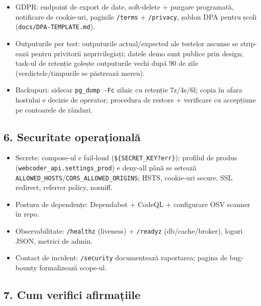\documentclass[
]{article}
\providecommand{\tightlist}{%
  \setlength{\itemsep}{0pt}\setlength{\parskip}{0pt}}
\begin{document}
\begin{itemize}
\tightlist
\item
  GDPR: endpoint de export de date, soft-delete + purgare programată,
  notificare de cookie-uri, paginile \texttt{/terms} +
  \texttt{/privacy}, șablon DPA pentru școli
  (\texttt{docs/DPA-TEMPLATE.md}).
\item
  Outputurile per test: outputurile actual/expected ale testelor ascunse
  se strip-ează pentru privitorii neprivilegiați; datele demo sunt
  publice prin design; task-ul de retenție golește outputurile vechi
  după 90 de zile (verdictele/timpurile se păstrează mereu).
\item
  Backupuri: sidecar \texttt{pg\_dump\ -Fc} zilnic cu retenție 7z/4s/6l;
  copia în afara hostului e decizie de operator; procedura de restore +
  verificare cu accepțiune pe contoarele de rânduri.
\end{itemize}

\subsection{6. Securitate
operațională}\label{6-securitate-operaux21bionalux103}

\begin{itemize}
\tightlist
\item
  Secrete: compose-ul e fail-loud (\texttt{\$\{SECRET\_KEY?err\}});
  profilul de produs (\texttt{webcoder\_api.settings\_prod}) e deny-all
  până se setează
  \texttt{ALLOWED\_HOSTS}/\texttt{CORS\_ALLOWED\_ORIGINS}; HSTS,
  cookie-uri secure, SSL redirect, referrer policy, nosniff.
\item
  Postura de dependențe: Dependabot + CodeQL + configurare OSV scanner
  în repo.
\item
  Observabilitate: \texttt{/healthz} (liveness) + \texttt{/readyz}
  (db/cache/broker), loguri JSON, metrici de admin.
\item
  Contact de incident: \texttt{/security} documentează raportarea;
  pagina de bug-bounty formalizează scope-ul.
\end{itemize}

\subsection{7. Cum verifici
afirmațiile}\label{7-cum-verifici-afirmaux21biile}
\end{document}
